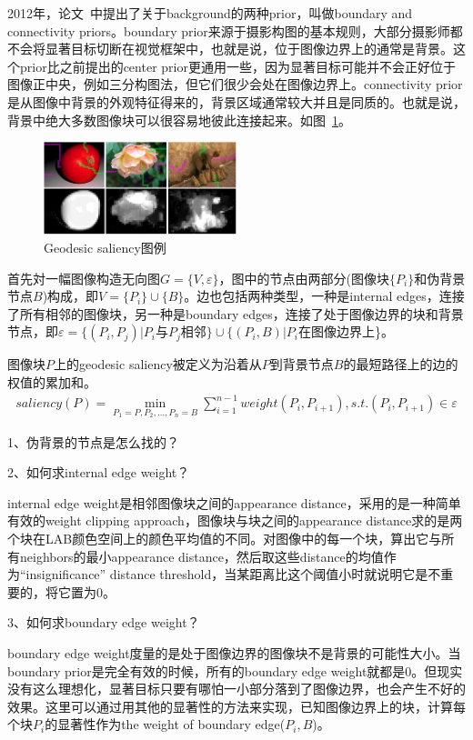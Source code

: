 \documentclass[12pt]{article}
\begin{document}
2012年，论文~\cite{wei2012geodesic}中提出了关于background的两种prior，叫做boundary and connectivity priors。boundary prior来源于摄影构图的基本规则，大部分摄影师都不会将显著目标切断在视觉框架中，也就是说，位于图像边界上的通常是背景。这个prior比之前提出的center prior更通用一些，因为显著目标可能并不会正好位于图像正中央，例如三分构图法，但它们很少会处在图像边界上。connectivity prior是从图像中背景的外观特征得来的，背景区域通常较大并且是同质的。也就是说，背景中绝大多数图像块可以很容易地彼此连接起来。如图~\ref{fig: GS}。
\begin{figure}[!ht]
\centering
\includegraphics[width=0.5\textwidth]{GS.png}
\caption{Geodesic saliency图例}
\label{fig: GS}
\end{figure} 

首先対一幅图像构造无向图$G = \{V, \varepsilon \}$，图中的节点由两部分(图像块$\{P_i\}$和伪背景节点$B$)构成，即$V = \{P_i\}\cup \{B\}$。边也包括两种类型，一种是internal edges，连接了所有相邻的图像块，另一种是boundary edges，连接了处于图像边界的块和背景节点，即$\varepsilon = \{(P_i, P_j)|$$P_i$与$P_j$相邻$\} \cup \{(P_i, B)|$$P_i$在图像边界上\}。

图像块$P$上的geodesic saliency被定义为沿着从$P$到背景节点$B$的最短路径上的边的权值的累加和。
\begin{align}
saliency(P) = \min_{P_1=P, P_2, \ldots, P_n=B}\sum_{i=1}^{n-1}weight(P_i, P_{i+1}), s.t.(P_i, P_{i+1})\in \varepsilon
\end{align}

1、伪背景的节点是怎么找的？

2、如何求internal edge weight？

internal edge weight是相邻图像块之间的appearance distance，采用的是一种简单有效的weight clipping approach，图像块与块之间的appearance distance求的是两个块在LAB颜色空间上的颜色平均值的不同。对图像中的每一个块，算出它与所有neighbors的最小appearance distance，然后取这些distance的均值作为“insignificance” distance threshold，当某距离比这个阈值小时就说明它是不重要的，将它置为0。

3、如何求boundary edge weight？

boundary edge weight度量的是处于图像边界的图像块不是背景的可能性大小。当boundary prior是完全有效的时候，所有的boundary edge weight就都是0。但现实没有这么理想化，显著目标只要有哪怕一小部分落到了图像边界，也会产生不好的效果。这里可以通过用其他的显著性的方法来实现，已知图像边界上的块，计算每个块$P_i$的显著性作为the weight of boundary edge($P_i, B$)。
\end{document}
